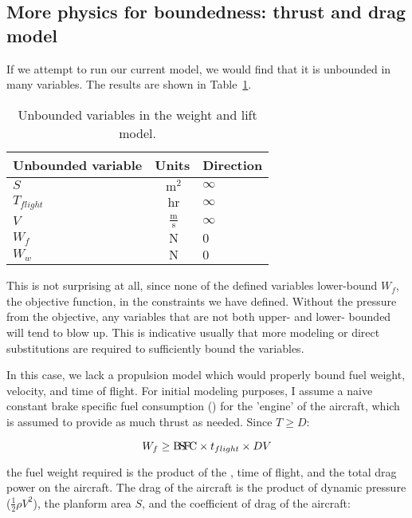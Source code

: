 \subsection{More physics for boundedness: thrust and drag model}
\label{s:td}

If we attempt to run our current model, we would find that it is unbounded in many variables.
The results are shown in Table~\ref{t:WandL_unbounded}.

\begin{footnotesize}
\begin{table}
    \centering
    \begin{tabular}{ l c l }
        \toprule
        Unbounded variable & Units & Direction \\
        \midrule
        $S$ & $~\mathrm{m^{2}}$ & $\infty$ \\
        $T_{flight}$ & $~\mathrm{hr}$ & $\infty$ \\
        $V$ &  $~\mathrm{\tfrac{m}{s}}$  & $\infty$ \\
        $W_f$ & $~\mathrm{N}$ & $0$ \\
        $W_w$ & $~\mathrm{N}$  & $0$ \\
        \bottomrule
    \end{tabular}
    \caption{Unbounded variables in the weight and lift model.}
    \label{t:WandL_unbounded}
\end{table} \end{footnotesize}

This is not surprising at all, since none of the defined variables lower-bound $W_f$,
the objective function, in the constraints we have defined.
Without the pressure from the objective, any variables that
are not both upper- and lower- bounded will tend to blow up. This is indicative usually
that more modeling or direct substitutions are required to sufficiently bound the variables.

In this case, we lack a propulsion model which would properly bound fuel weight, velocity,
and time of flight. For initial modeling purposes, I assume a naive constant brake
specific fuel consumption (\BSFC) for the 'engine' of the aircraft, which is assumed
to provide as much thrust as needed. Since $T \geq D$:

\begin{equation}
    W_f \geq {\rm B\!S\!F\!C} \times t_{flight} \times DV
    \label{e:W_f}
\end{equation}

the fuel weight required is the product of the \BSFC, time of flight, and the
total drag power on the aircraft.
The drag of the aircraft is the product of dynamic pressure ($\frac{1}{2} \rho V^2$),
the planform area $S$, and the coefficient of drag of the aircraft:

